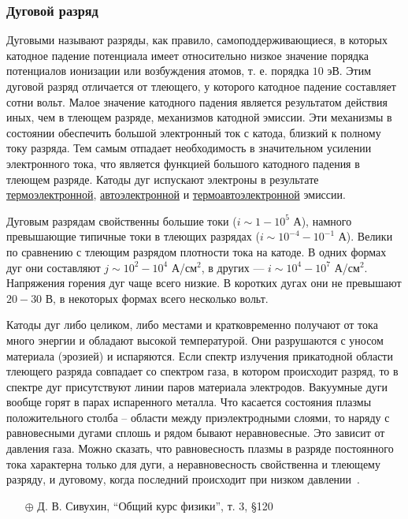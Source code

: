 \documentclass[10pt, a4paper]{article}
\begin{document}
\subsubsection{Дуговой разряд}

Дуговыми называют разряды, как правило, самоподдерживающиеся, в которых катодное падение потенциала имеет относительно низкое значение порядка потенциалов ионизации или возбуждения атомов, т. е. порядка $10$ эВ. Этим дуговой разряд отличается от тлеющего, у которого катодное падение составляет сотни вольт. Малое значение катодного падения является результатом действия иных, чем в тлеющем разряде, механизмов катодной эмиссии. Эти механизмы в состоянии обеспечить большой электронный ток с катода, близкий к полному току разряда. Тем самым отпадает необходимость в значительном усилении электронного тока, что является функцией большого катодного падения в тлеющем разряде. Катоды дуг испускают электроны в результате \uline{термоэлектронной}, \uline{автоэлектронной} и \uline{термоавтоэлектронной} эмиссии.

Дуговым разрядам свойственны большие токи ($i\sim1-10^5$ А), намного превышающие типичные токи в тлеющих разрядах ($i\sim10^{-4}-10^{-1}$ А). Велики по сравнению с тлеющим разрядом плотности тока на катоде. В одних формах дуг они составляют $j\sim10^2-10^4$ А/см$^2$, в других — $i\sim10^4-10^7$ А/см$^2$. Напряжения горения дуг чаще всего низкие. В коротких дугах они не превышают $20-30$ В, в некоторых формах всего несколько вольт.

Катоды дуг либо целиком, либо местами и кратковременно получают от тока много энергии и обладают высокой температурой. Они разрушаются с уносом материала (эрозией) и испаряются. Если спектр излучения прикатодной области тлеющего разряда совпадает со спектром газа, в котором происходит разряд, то в спектре дуг присутствуют линии паров материала электродов. Вакуумные дуги вообще горят в парах испаренного металла. Что касается состояния плазмы положительного столба -- области между приэлектродными слоями, то наряду с равновесными дугами сплошь и рядом бывают неравновесные. Это зависит от давления газа. Можно сказать, что равновесность плазмы в разряде постоянного тока характерна только для дуги, а неравновесность свойственна и тлеющему разряду, и дуговому, когда последний происходит при низком давлении~\cite{raizer}.

\begin{itemize}
	\item[$\oplus$] Д. В. Сивухин, ``Общий курс физики'', т. 3, \S 120
\end{itemize}
\end{document}
